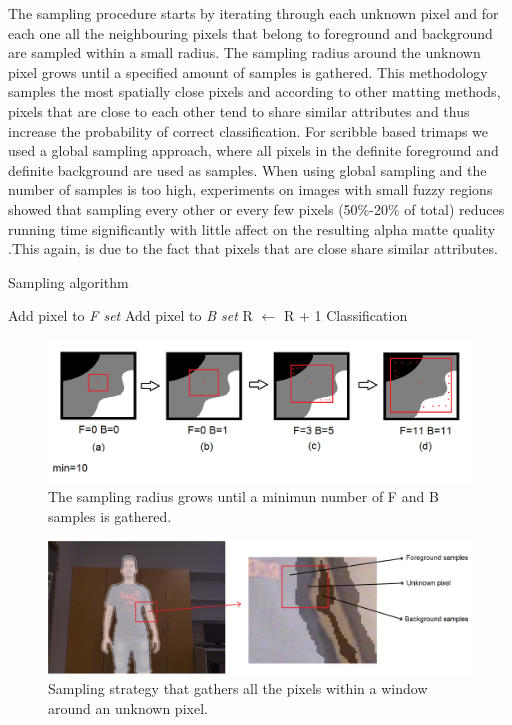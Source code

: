 The sampling procedure starts by iterating through each unknown pixel and for each one all the neighbouring pixels that belong to foreground and background are sampled within a small radius. The sampling radius around the unknown pixel grows until a specified amount of samples is gathered. This methodology samples the most spatially close pixels and according to other matting methods, pixels that are close to each other tend to share similar attributes and thus increase the probability of correct classification. For scribble based trimaps we used a global sampling approach, where all pixels in the definite foreground and definite background are used as samples. When using global sampling and the number of samples is too high, experiments on images with small fuzzy regions showed that sampling every other or every few pixels (50\%-20\% of total) reduces running time significantly with little affect on the resulting alpha matte quality .This again, is due to the fact that pixels that are close share similar attributes.

\begin{algorithm}
\caption{Sampling algorithm}\label{sampling-algorithm}
\begin{algorithmic}[1]
\State Add pixel to \textit{F set}
\State Add pixel to \textit{B set}
\EndFor
\State R $\gets$ R + 1
\EndWhile
\State Classification
\EndFor
\end{algorithmic}
\end{algorithm}

\begin{figure}[t!]
\centering
\includegraphics[width=1\columnwidth]{Chapter5/5/win.png}
\caption[Sampling radius.]{The sampling radius grows until a minimun number of F and B samples is gathered.}
\label{fig:window-f}
\end{figure}

\begin{figure}[t!]
\centering
\includegraphics[width=1\columnwidth]{Chapter5/5/sampling_window.jpg}
\caption[New sampling strategy.]{Sampling strategy that gathers all the pixels within a window around an unknown pixel.}
\label{fig:sampling-window-f}
\end{figure}

